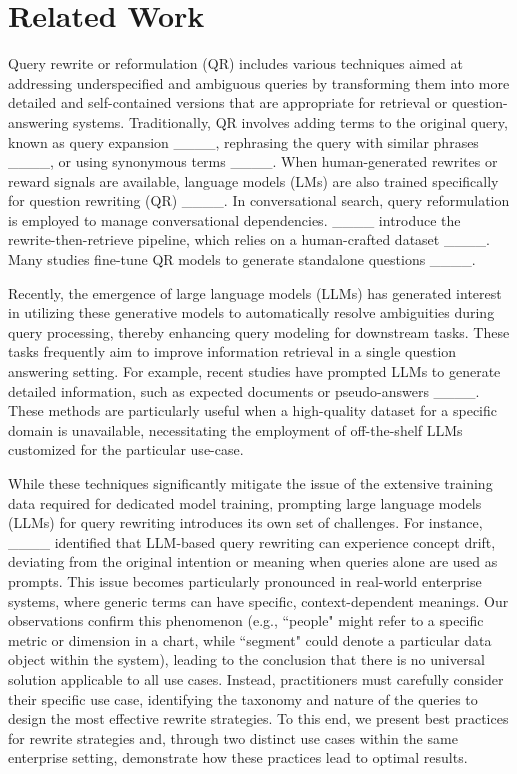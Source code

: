\section{Related Work}
\label{sec:related-work}


Query rewrite or reformulation (QR) includes various techniques aimed at addressing underspecified and ambiguous queries by transforming them into more detailed and self-contained versions that are appropriate for retrieval or question-answering systems. Traditionally, QR involves adding terms to the original query, known as query expansion ____, rephrasing the query with similar phrases ____, or using synonymous terms ____. When human-generated rewrites or reward signals are available, language models (LMs) are also trained specifically for question rewriting (QR) ____. In conversational search, query reformulation is employed to manage conversational dependencies. ____ introduce the rewrite-then-retrieve pipeline, which relies on a human-crafted dataset ____. Many studies fine-tune QR models to generate standalone questions ____.

Recently, the emergence of large language models (LLMs) has generated interest in utilizing these generative models to automatically resolve ambiguities during query processing, thereby enhancing query modeling for downstream tasks. These tasks frequently aim to improve information retrieval in a single question answering setting. For example, recent studies have prompted LLMs to generate detailed information, such as expected documents or pseudo-answers ____. These methods are particularly useful when a high-quality dataset for a specific domain is unavailable, necessitating the employment of off-the-shelf LLMs customized for the particular use-case. 

While these techniques significantly mitigate the issue of the extensive training data required for dedicated model training, prompting large language models (LLMs) for query rewriting introduces its own set of challenges. For instance, ____ identified that LLM-based query rewriting can experience concept drift, deviating from the original intention or meaning when queries alone are used as prompts. This issue becomes particularly pronounced in real-world enterprise systems, where generic terms can have specific, context-dependent meanings. Our observations confirm this phenomenon (e.g., ``people" might refer to a specific metric or dimension in a chart, while ``segment" could denote a particular data object within the system), leading to the conclusion that there is no universal solution applicable to all use cases. Instead, practitioners must carefully consider their specific use case,
identifying the taxonomy and nature of the queries to design the most effective rewrite strategies. To this end, we present best practices for rewrite strategies and, through two distinct use cases within the same enterprise setting, demonstrate how these practices lead to optimal results.